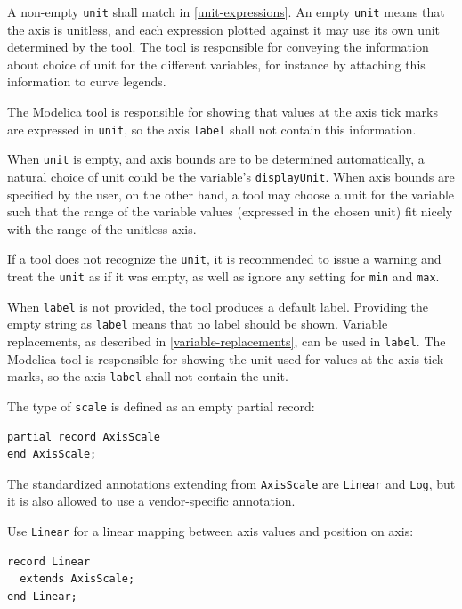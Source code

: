 A non-empty \lstinline!unit! shall match  in \cref{unit-expressions}.
An empty \lstinline!unit! means that the axis is unitless, and each expression plotted against it may use its own unit determined by the tool.
The tool is responsible for conveying the information about choice of unit for the different variables, for instance by attaching this information to curve legends.

The Modelica tool is responsible for showing that values at the axis tick marks are expressed in \lstinline!unit!, so the axis \lstinline!label! shall not contain this information.

\begin{nonnormative}
When \lstinline!unit! is empty, and axis bounds are to be determined automatically, a natural choice of unit could be the variable's \lstinline!displayUnit!.
When axis bounds are specified by the user, on the other hand, a tool may choose a unit for the variable such that the range of the variable values (expressed in the chosen unit) fit nicely with the range of the unitless axis.
\end{nonnormative}

If a tool does not recognize the \lstinline!unit!, it is recommended to issue a warning and treat the \lstinline!unit! as if it was empty, as well as ignore any setting for \lstinline!min! and \lstinline!max!.

When \lstinline!label! is not provided, the tool produces a default label.
Providing the empty string as \lstinline!label! means that no label should be shown.
Variable replacements, as described in \cref{variable-replacements}, can be used in \lstinline!label!.
The Modelica tool is responsible for showing the unit used for values at the axis tick marks, so the axis \lstinline!label! shall not contain the unit.

The type of \lstinline!scale! is defined as an empty partial record:
\begin{lstlisting}[language=modelica]
partial record AxisScale
end AxisScale;
\end{lstlisting}%

The standardized annotations extending from \lstinline!AxisScale! are \lstinline!Linear! and  \lstinline!Log!, but it is also allowed to use a vendor-specific annotation.

Use \lstinline!Linear! for a linear mapping between axis values and position on axis:
\begin{lstlisting}[language=modelica]
record Linear
  extends AxisScale;
end Linear;
\end{lstlisting}%

